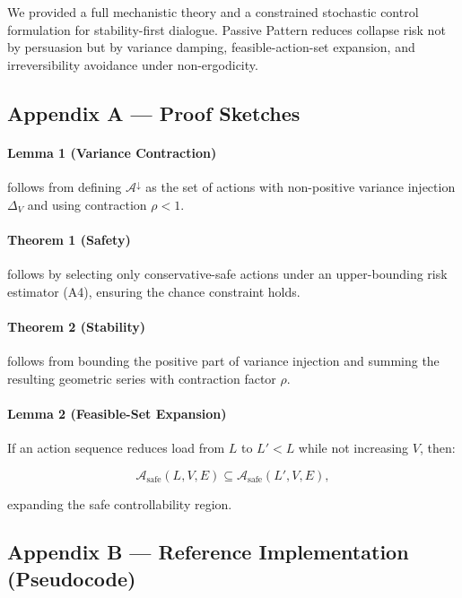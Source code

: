 We provided a full mechanistic theory and a constrained stochastic
control formulation for stability-first dialogue. Passive Pattern
reduces collapse risk not by persuasion but by variance damping,
feasible-action-set expansion, and irreversibility avoidance under
non-ergodicity.

\subsection*{Appendix A --- Proof Sketches}
\label{sec:pp-app-A}

\paragraph{Lemma 1 (Variance Contraction)} follows from defining
$\mathcal{A}^{\downarrow}$ as the set of actions with non-positive
variance injection $\Delta_V$ and using contraction $\rho < 1$.

\paragraph{Theorem 1 (Safety)} follows by selecting only
conservative-safe actions under an upper-bounding risk estimator
(A4), ensuring the chance constraint holds.

\paragraph{Theorem 2 (Stability)} follows from bounding the positive
part of variance injection and summing the resulting geometric
series with contraction factor $\rho$.

\paragraph{Lemma 2 (Feasible-Set Expansion)} If an action sequence
reduces load from $L$ to $L' < L$ while not increasing $V$, then:

\begin{equation}
\mathcal{A}_{\mathrm{safe}}(L, V, E) \subseteq
\mathcal{A}_{\mathrm{safe}}(L', V, E),
\end{equation}

\noindent
expanding the safe controllability region.

\subsection*{Appendix B --- Reference Implementation (Pseudocode)}
\label{sec:pp-app-B}


